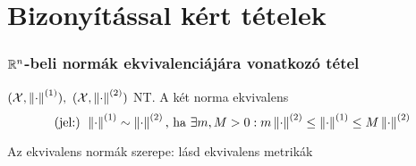 \part{Bizonyítással kért tételek}
\section{$\R^n$-beli normák ekvivalenciájára vonatkozó tétel}
\begin{de}
  $(\X,\Norman1),\ (\X,\Norman2)$ NT. A két norma ekvivalens 
  \[ \text{(jel:) } \Norman1\sim\Norman2\text{, ha }\exists m,M>0:m\Norman2\leq \Norman1\leq M\Norman2\]    
\end{de}
\begin{megj}
  Az ekvivalens normák szerepe: lásd ekvivalens metrikák
\end{megj}



